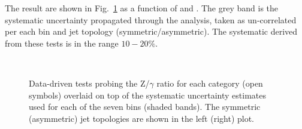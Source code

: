 The result are shown in Fig.~\ref{fig:closurePhoToMuMu} as a function of \scalht and \njet. 
The grey band is the systematic uncertainty propagated through the analysis, 
taken as un-correlated per each \scalht bin and jet topology (symmetric/asymmetric). The systematic derived from these tests is
in the range $10-20\%$.


\begin{figure}[h!]
  \begin{center}
    ~~
    \caption{Data-driven tests probing the Z/$\gamma$ ratio for each
      \njet category (open symbols) overlaid on top of the systematic
      uncertainty estimates used for each of the seven \scalht bins
      (shaded bands). 
      The symmetric (asymmetric) jet topologies are shown in the left (right) plot.      
    }
    \label{fig:closurePhoToMuMu}
  \end{center} 
\end{figure}





